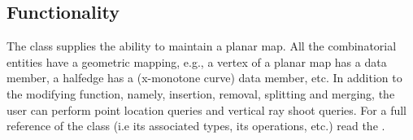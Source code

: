 



\subsection*{Functionality}

The class   supplies the ability to maintain
a planar map. All the combinatorial entities have a geometric mapping, e.g.,
a vertex of a planar map has a  data member, a halfedge has
a  (x-monotone curve) data member, etc. In addition to the 
modifying function, namely, insertion, removal, splitting and merging, the user
can perform point location queries and vertical ray shoot queries.
For a full reference of the class (i.e its associated types,
its operations, etc.) read the .

